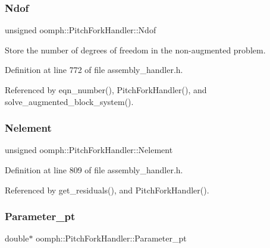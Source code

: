 \subsubsection{\texorpdfstring{Ndof}{Ndof}}
{\footnotesize\ttfamily unsigned oomph\+::\+Pitch\+Fork\+Handler\+::\+Ndof\hspace{0.3cm}{\ttfamily [private]}}



Store the number of degrees of freedom in the non-\/augmented problem. 



Definition at line 772 of file assembly\+\_\+handler.\+h.



Referenced by eqn\+\_\+number(), Pitch\+Fork\+Handler(), and solve\+\_\+augmented\+\_\+block\+\_\+system().

\mbox{\label{classoomph_1_1PitchForkHandler_ac85263fcd40fa913e4bc12c07f6b7343}} 
\subsubsection{\texorpdfstring{Nelement}{Nelement}}
{\footnotesize\ttfamily unsigned oomph\+::\+Pitch\+Fork\+Handler\+::\+Nelement\hspace{0.3cm}{\ttfamily [private]}}



Definition at line 809 of file assembly\+\_\+handler.\+h.



Referenced by get\+\_\+residuals(), and Pitch\+Fork\+Handler().

\mbox{\label{classoomph_1_1PitchForkHandler_aa0e8800d56e68fcb63ec2315f503cab2}} 
\subsubsection{\texorpdfstring{Parameter\+\_\+pt}{Parameter\_pt}}
{\footnotesize\ttfamily double$\ast$ oomph\+::\+Pitch\+Fork\+Handler\+::\+Parameter\+\_\+pt\hspace{0.3cm}{\ttfamily [private]}}



